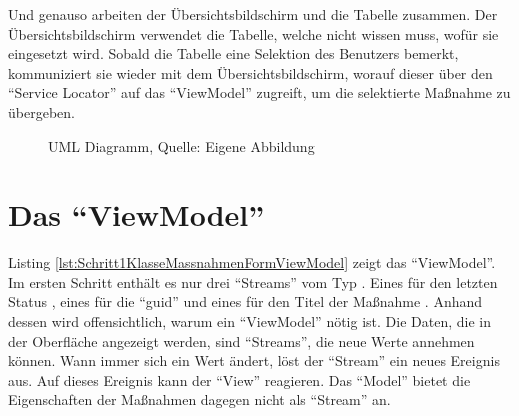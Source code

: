 Und genauso arbeiten der Übersichtsbildschirm und die Tabelle zusammen.
Der Übersichtsbildschirm verwendet die Tabelle, welche nicht wissen muss, wofür sie eingesetzt wird.
Sobald die Tabelle eine Selektion des Benutzers bemerkt, kommuniziert sie wieder mit dem Übersichtsbildschirm, worauf dieser über den \enquote{Service Locator} auf das \enquote{ViewModel} zugreift, um die selektierte Maßnahme zu übergeben.

\ifIncludeFigures
  \begin{figure}[h]
    \centering


    \caption[UML Diagramm]{UML Diagramm, Quelle: Eigene Abbildung}
    \label{lst:UmlOnSelet}

  \end{figure}%
\fi





\clearpage
\section{Das \enquote{ViewModel}}

Listing \ref{lst:Schritt1KlasseMassnahmenFormViewModel} zeigt das \enquote{ViewModel}.
Im ersten Schritt enthält es nur drei \enquote{Streams} vom Typ .
Eines für den letzten Status , eines für die \enquote{guid}  und eines für den Titel der Maßnahme .
Anhand dessen wird offensichtlich, warum ein \enquote{ViewModel} nötig ist.
Die Daten, die in der Oberfläche angezeigt werden, sind \enquote{Streams}, die neue Werte annehmen können.
Wann immer sich ein Wert ändert, löst der \enquote{Stream} ein neues Ereignis aus.
Auf dieses Ereignis kann der \enquote{View} reagieren.
Das \enquote{Model} bietet die Eigenschaften der Maßnahmen dagegen nicht als \enquote{Stream} an.

